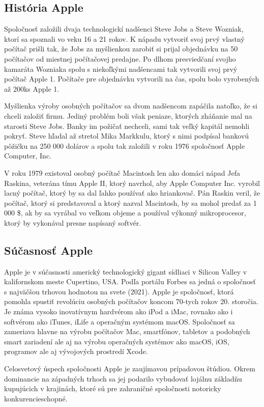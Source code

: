 \documentclass[12pt]{article}
\begin{document}
		\subsection{História Apple}
			Spoločnosť založili dvaja technologickí nadšenci Steve Jobs a Steve Wozniak,  ktorí sa spoznali vo veku 16 a 21 rokov.  K nápadu vytvoriť svoj prvý vlastný počítač prišli tak,  že Jobs za myšlienkou zarobiť si prijal objednávku na 50 počítačov od miestnej počítačovej predajne.  Po dlhom presviedčaní svojho kamaráta Wozniaka spolu s niekoľkými nadšencami tak vytvorili svoj prvý počítač Apple 1.  Počítače pre objednávku vytvorili na čas,  spolu bolo vyrobených až 200ks Apple 1. \cite{applewiki} \par
			Myšlienka výroby osobných počítačov sa dvom nadšencom zapáčila natoľko,  že si chceli založiť firmu.  Jediný problém boli však peniaze,  ktorých zháňanie mal na starosti Steve Jobs.  Banky im požičať nechceli,  sami tak veľký kapitál nemohli pokryť.  Steve hľadal až stretol Mika Markkulu,  ktorý s nimi podpísal bankovú pôžičku na 250 000 dolárov a spolu tak založili v roku 1976 spoločnosť Apple Computer, Inc.  \cite{applewiki} \par
			V roku 1979 existoval osobný počítač Macintosh len ako domáci nápad Jefa Raskina, veterána tímu Apple II, ktorý navrhol, aby Apple Computer Inc. vyrobil lacný počítač, ktorý by sa dal ľahko používať ako hriankovač. Pán Raskin veril, že počítač, ktorý si predstavoval a ktorý nazval Macintosh, by sa mohol predať za 1 000 \$, ak by sa vyrábal vo veľkom objeme a používal výkonný mikroprocesor, ktorý by vykonával presne napísaný softvér. \cite{history}

		\subsection{Súčasnosť Apple}
			Apple je v súčasnosti americký technologický gigant sídliaci v Silicon Valley v kalifornskom meste Cupertino,  USA.  Podľa portálu Forbes sa jedná o spoločnosť s najväčšou trhovou hodnotou na svete (2021). Apple je spoločnosť, ktorá pomohla spustiť revolúciu osobných počítačov koncom 70-tych rokov 20. storočia. Je známa vysoko inovatívnym hardvérom ako iPod a iMac, rovnako ako i softvérom ako iTunes, iLife a operačným systémom macOS.  Spoločnosť sa zameriava hlavne na výrobu počítačov Mac,  smartfónov,  tabletov a podobných smart zariadení ale aj na výrobu operačných systémov ako macOS,  iOS,  programov ale aj vývojových prostredí Xcode. \cite{applewiki} \par
			Celosvetový úspech spoločnosti Apple je zaujímavou prípadovou štúdiou. Okrem dominancie na západných trhoch sa jej podarilo vybudovať lojálnu základňu kupujúcich v krajinách, ktoré sú pre zahraničné spoločnosti notoricky konkurencieschopné. \par
\end{document}
